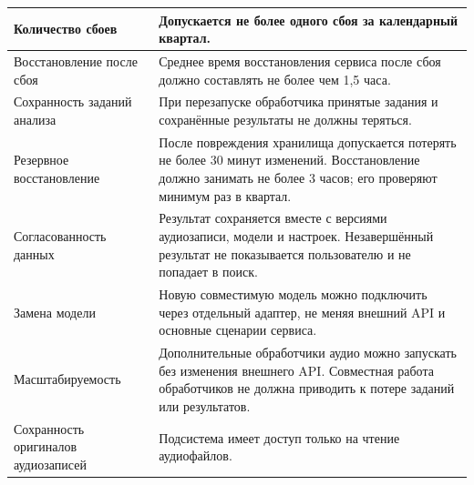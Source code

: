 \begin{longtable}{|L{0.25\textwidth}|L{0.63\textwidth}|}
\hline
Количество сбоев & Допускается не более одного сбоя за календарный квартал. \\
\hline
Восстановление после сбоя & Среднее время восстановления сервиса после сбоя должно составлять не более чем 1,5 часа. \\
\hline
Сохранность заданий анализа & При перезапуске обработчика принятые задания и сохранённые результаты не должны теряться. \\
\hline
Резервное восстановление & После повреждения хранилища допускается потерять не более 30 минут изменений. Восстановление должно занимать не более 3 часов; его проверяют минимум раз в квартал. \\
\hline
Согласованность данных & Результат сохраняется вместе с версиями аудиозаписи, модели и настроек. Незавершённый результат не показывается пользователю и не попадает в поиск. \\
\hline
Замена модели & Новую совместимую модель можно подключить через отдельный адаптер, не меняя внешний API и основные сценарии сервиса. \\
\hline
Масштабируемость & Дополнительные обработчики аудио можно запускать без изменения внешнего API. Совместная работа обработчиков не должна приводить к потере заданий или результатов. \\
\hline
Сохранность оригиналов аудиозаписей & Подсистема имеет доступ только на чтение аудиофайлов. \\
\hline
\end{longtable}
\endgroup
